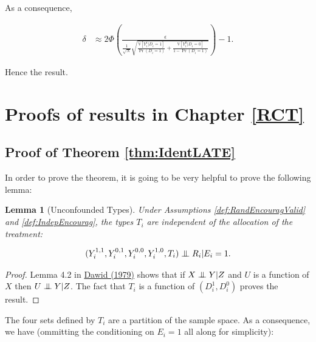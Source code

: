 \documentclass[
]{book}
\newcommand\Ind{\protect\mathpalette{\protect\independenT}{\perp}}
\def\independenT#1#2{\mathrel{\setbox0\hbox{$#1#2$}\copy0\kern-\wd0\mkern4mu\box0}}
\newcommand{\var}[1]{\mathbb{V}[ #1 ]}
\newtheorem{lemma}{Lemma}[chapter]
\theoremstyle{definition}
\theoremstyle{definition}
\theoremstyle{definition}
\theoremstyle{definition}
\theoremstyle{remark}
\begin{document}
As a consequence,

\begin{align*}
\delta & \approx 2\Phi\left(\frac{\epsilon}{\frac{1}{\sqrt{N}}\sqrt{\frac{\var{Y_i^1|D_i=1}}{\Pr(D_i=1)}+\frac{\var{Y_i^0|D_i=0}}{1-\Pr(D_i=1)}}}\right)-1.
\end{align*}

Hence the result.

\hypertarget{proofs-of-results-in-chapter-refrct}{%
\section{Proofs of results in Chapter \ref{RCT}}\label{proofs-of-results-in-chapter-refrct}}

\hypertarget{proofIdentLATE}{%
\subsection{Proof of Theorem \ref{thm:IdentLATE}}\label{proofIdentLATE}}

In order to prove the theorem, it is going to be very helpful to prove the following lemma:

\begin{lemma}[Unconfounded Types]
\protect\hypertarget{lem:UnconfTypes}{}{\label{lem:UnconfTypes} \iffalse (Unconfounded Types) \fi{} }Under Assumptions \ref{def:RandEncouragValid} and \ref{def:IndepEncourag}, the types \(T_i\) are independent of the allocation of the treatment:

\begin{align*}
(Y_i^{1,1},Y_i^{0,1},Y_i^{0,0},Y_i^{1,0},T_i)\Ind R_i|E_i=1.
\end{align*}
\end{lemma}

\begin{proof}
\iffalse{} {Proof. } \fi{}Lemma 4.2 in \href{https://www.jstor.org/stable/2984718}{Dawid (1979)} shows that if \(X\Ind Y|Z\) and \(U\) is a function of \(X\) then \(U\Ind Y|Z\).
The fact that \(T_i\) is a function of \((D_i^1,D^0_i)\) proves the result.
\end{proof}

The four sets defined by \(T_i\) are a partition of the sample space.
As a consequence, we have (ommitting the conditioning on \(E_i=1\) all along for simplicity):
\end{document}
